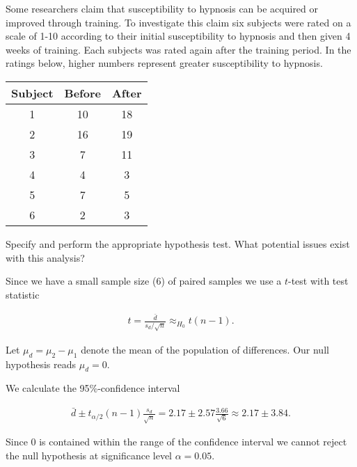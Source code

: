 
\begin{exercise}

Some researchers claim that susceptibility to hypnosis can be acquired
or improved through training. To investigate this claim six subjects
were rated on a scale of 1-10 according to their initial susceptibility
to hypnosis and then given 4 weeks of training. Each subjects was rated
again after the training period. In the ratings below, higher numbers
represent greater susceptibility to hypnosis.

\begin{center}
    \begin{tabular}{c|c|c}
    \hline
    Subject & Before & After \\
    \hline
    1 & 10 & 18 \\
    2 & 16 & 19 \\
    3 & 7 & 11 \\
    4 & 4 & 3 \\
    5 & 7 & 5 \\
    6 & 2 & 3 \\
    \hline
    \end{tabular}
\end{center}

Specify and perform the appropriate hypothesis test. What potential issues
exist with this analysis?

\end{exercise}


\begin{solution}

Since we have a small sample size (6) of paired samples we use a $t$-test
with test statistic

\begin{align*}
    t = \frac{\bar{d}}{s_d/\sqrt{n}} \approx_{H_0} t(n - 1).
\end{align*}

Let $\mu_d = \mu_2 - \mu_1$ denote the mean of the population of differences.
Our null hypothesis reads $\mu_d = 0$.

We calculate the 95\%-confidence interval

\begin{align*}
    \bar{d} \pm t_{\alpha/2}(n-1) \frac{s_d}{\sqrt{n}}
    = 2.17 \pm 2.57 \frac{3.66}{\sqrt{6}}
    \approx 2.17 \pm 3.84.
\end{align*}

Since $0$ is contained within the range of the confidence interval we cannot
reject the null hypothesis at significance level $\alpha = 0.05$.
\end{solution}

